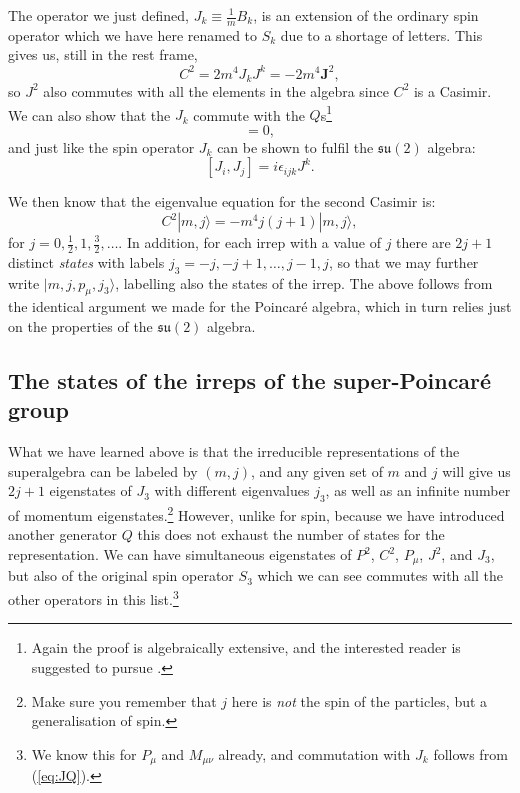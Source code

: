 \documentclass[notes.tex]{subfiles}
\begin{document}
The operator we just defined, $J_k \equiv \frac{1}{m} B_k$, is an extension of the ordinary spin operator which we have here renamed to $S_k$ due to a shortage of letters. This gives us, still in the rest frame,
\[C^2 = 2m^4 J_k J^k= -2m^4 \mathbf J^2,\]
so $J^2$ also commutes with all the elements in the algebra since $C^2$ is a Casimir. We can also show that the $J_k$ commute with the $Q$s\footnote{Again the proof is algebraically extensive, and  the interested reader is suggested to pursue \cite{IntrSUSY2010}.}
\begin{equation}
[J_k,Q_a]=0,
\label{eq:JQ}
\end{equation} 
and just like the spin operator $J_k$ can be shown to fulfil the  $\mathfrak{su}(2)$ algebra:
\[[J_i, J_j] = i\epsilon_{ijk}J^k.\]


We then know that the eigenvalue equation for the second Casimir is:
\[C^2|m, j \rangle = -m^4 j(j+1)|m, j\rangle,\]
for $j=0,\frac{1}{2},1,\frac{3}{2},\ldots$. In addition, for each irrep with a value of $j$ there are $2j+1$ distinct {\it states} with labels $j_3 = -j, -j+1,\ldots,j-1,j$, so that we may  further  write $|m, j, p_\mu, j_3\rangle$,
labelling also the states of the irrep. The above follows from the identical argument we made for the Poincaré algebra, which in turn relies just on the properties of the $\mathfrak{su}(2)$ algebra. 


\subsection{The states of the irreps of the super-Poincaré group}
\label{sec:superalgebrarep}
What we have learned above is that the irreducible representations of the superalgebra can be labeled by $(m, j)$, and any given set of $m$ and $j$ will give us $2j+1$ eigenstates of $J_3$ with different eigenvalues $j_3$, as well as an infinite number of momentum eigenstates.\footnote{Make sure you remember that $j$ here is {\it not} the spin of the particles, but a generalisation of spin.}
However, unlike for spin, because we have introduced another generator $Q$ this does not exhaust the number of states for the representation. We can have simultaneous eigenstates of $P^2$, $C^2$, $P_\mu$, $J^2$, and $J_3$, but also of the original spin operator $S_3$ which we can see commutes with all the other operators in this list.\footnote{We know this for $P_\mu$ and $M_{\mu\nu}$ already, and commutation with $J_k$ follows from (\ref{eq:JQ}).}
\end{document}
